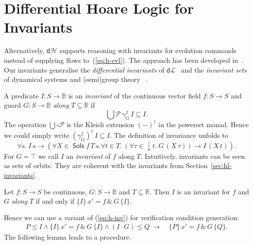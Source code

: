 \documentclass[envcountsame,envcountsect]{llncs}
\newcommand{\dL}{\mathsf{d}\mathcal{L}}
\newcommand{\dH}{\mathsf{d}\mathcal{H}}
\newcommand{\Pow}{\mathcal{P}}
\newcommand{\reals}{\mathbb{R}}
\newcommand{\bools}{\mathbb{B}}
\newcommand{\Sols}{\mathop{\mathsf{Sols}}}
\begin{document}

\section{Differential Hoare Logic for Invariants}\label{sec:hoare-inv}

Alternatively, $\dH$ supports reasoning with invariants for evolution
commands instead of supplying flows to~(\ref{eq:h-evl}).  The approach
has been developed in~\cite{MuniveS19}. Our invariants generalise the
\emph{differential invariants} of $\dL$~\cite{Platzer18} and the
\emph{invariant sets} of dynamical systems and (semi)group
theory~\cite{Teschl12} .

A predicate $I:S\to\bools$ is an \emph{invariant} of the continuous
vector field $f:S\to S$ and guard $G:S\to\bools$ \emph{along}
$T\subseteq \reals$ if
\begin{equation*}
\bigcup \Pow\, \gamma^f_G\, I\subseteq  I.
\end{equation*}
The operation $\bigcup\circ\Pow$ is the Kleisli extension $(-)^\dagger$
in the powerset monad. Hence we could simply write
$(\gamma^f_G)^\dagger\, I \subseteq I$. The definition of invariance
unfolds to
\begin{equation*}
  \forall s.\ I\, s \to (\forall X\in\Sols f\, T\, s.\forall t\in T.\ (\forall \tau\in {\downarrow}t.\ G\, (X\, \tau)) \to I\, (X\, t)).
\end{equation*}
For $G=\top$ we call $I$ an \emph{invariant} of $f$ along $T$.
Intuitively, invariants can be seen as sets of orbits. They are
coherent with the invariants from
Section~\ref{sec:hl-invariants}.
\begin{proposition}\label{P:inv-prop}
  Let $f:S\to S$ be continuous, $G:S\to\bools$ and
  $T\subseteq \reals$. Then $I$ is an invariant for $f$ and $G$ \emph{along} $T$ if and only if
$ \{I\}\, x' = f\, \&\, G\, \{I\}$.
\end{proposition}
Hence we can use a variant of (\ref{eq:h-inv}) for verification condition generation:
\begin{align}
  P\le I \land \{I\}\, x' = f\, \&\, G\, \{I\}\land (I\cdot G)\le Q\ \rightarrow\
  &\{P\}\, x' = f\, \&\, G\, \{Q\}.\label{eq:h-invg}\tag{h-invg}
\end{align}
The following lemma leads to a procedure.
\end{document}
